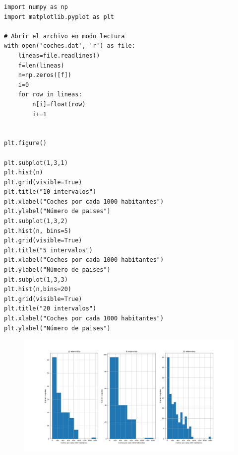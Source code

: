 \begin{verbatim}
import numpy as np
import matplotlib.pyplot as plt

# Abrir el archivo en modo lectura
with open('coches.dat', 'r') as file:
    lineas=file.readlines() 
    f=len(lineas)
    n=np.zeros([f])
    i=0
    for row in lineas:
        n[i]=float(row)
        i+=1


plt.figure()

plt.subplot(1,3,1)
plt.hist(n)
plt.grid(visible=True)
plt.title("10 intervalos")
plt.xlabel("Coches por cada 1000 habitantes")
plt.ylabel("Número de paises")
plt.subplot(1,3,2)
plt.hist(n, bins=5)
plt.grid(visible=True)
plt.title("5 intervalos")
plt.xlabel("Coches por cada 1000 habitantes")
plt.ylabel("Número de paises")
plt.subplot(1,3,3)
plt.hist(n,bins=20)
plt.grid(visible=True)
plt.title("20 intervalos")
plt.xlabel("Coches por cada 1000 habitantes")
plt.ylabel("Número de paises")
\end{verbatim}

\begin{figure}
    \centering
    \includegraphics[width=1\linewidth]{figuras/plt_hist.png}
    \label{fig:plt_hist}
\end{figure}

